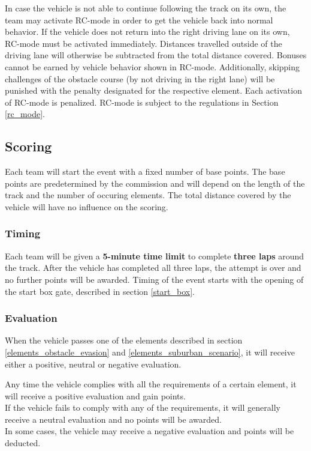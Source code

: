 In case the vehicle is not able to continue following the track on its own, the
team may activate RC-mode in order to get the vehicle back into normal
behavior. If the vehicle does not return into the right driving lane on its
own, RC-mode must be activated immediately. Distances travelled outside of the
driving lane will otherwise be subtracted from the total distance covered.
Bonuses cannot be earned by vehicle behavior shown in RC-mode. Additionally,
skipping challenges of the obstacle course (by not driving in the right lane)
will be punished with the penalty designated for the respective element. Each
activation of RC-mode is penalized. RC-mode is subject to the regulations in
Section \ref{rc_mode}.

\subsection{Scoring}{
	\label{obstacle_scoring}

	\renewcommand*\footnoterule{} %
	\newcommand{\topstrut}{\rule{0pt}{3.5ex}}

	Each team will start the event with a fixed number of base points. The base
	points are predetermined by the commission and will depend on the length of the
	track and the number of occuring elements. The total distance covered by the
	vehicle will have no influence on the scoring.

	\subsubsection{Timing}
	Each team will be given a \textbf{5-minute time limit} to complete
	\textbf{three laps} around the track. After the vehicle has completed all three
	laps, the attempt is over and no further points will be awarded. Timing of the
	event starts with the opening of the start box gate, described in section
	\ref{start_box}.

	\subsubsection{Evaluation}
	When the vehicle passes one of the elements described in section
	\ref{elements_obstacle_evasion} and \ref{elements_suburban_scenario}, it will
	receive either a positive, neutral or negative evaluation.

	Any time the vehicle complies with all the requirements of a certain element,
	it will receive a positive evaluation and gain points.\\ If the vehicle fails
	to comply with any of the requirements, it will generally receive a neutral
	evaluation and no points will be awarded.\\ In some cases, the vehicle may
	receive a negative evaluation and points will be deducted.

}

